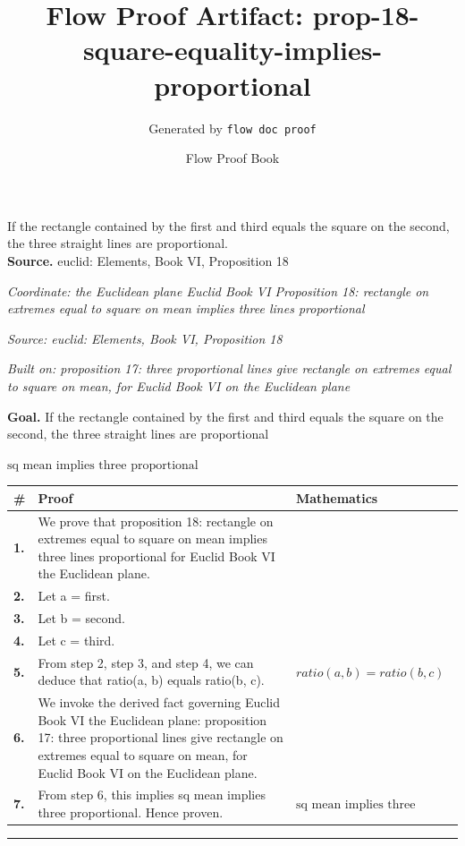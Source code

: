 \documentclass[11pt]{article}
\title{Flow Proof Artifact: prop-18-square-equality-implies-proportional}
\author{Generated by \texttt{flow doc proof}}
\date{Flow Proof Book}
\theoremstyle{definition}
\begin{document}
\maketitle
If the rectangle contained by the first and third equals the square on the second, the three straight lines are proportional.\\[0.5em]
\textbf{Source.} euclid: Elements, Book VI, Proposition 18\\[0.5em]
\bigskip
{}\par
\smallskip\noindent\textit{Coordinate: the Euclidean plane \cdot Euclid Book VI \cdot Proposition 18: rectangle on extremes equal to square on mean implies three lines proportional}\par
\smallskip\noindent\textit{Source: euclid: Elements, Book VI, Proposition 18}\par
\smallskip\noindent\textit{Built on: proposition 17: three proportional lines give rectangle on extremes equal to square on mean, for Euclid Book VI on the Euclidean plane}\par
\medskip
\noindent\textbf{Goal.} If the rectangle contained by the first and third equals the square on the second, the three straight lines are proportional\par
\noindent$\displaystyle \text{sq mean implies three proportional}$\par
\medskip
\noindent
\begin{tabular}{@{} >{\raggedright\arraybackslash}p{} >{\raggedright\arraybackslash}p{} >{\raggedleft\arraybackslash}p{} @{}}
\textbf{\#} & \textbf{Proof} & \textbf{Mathematics} \\
\midrule
\textbf{1.} & We prove that proposition 18: rectangle on extremes equal to square on mean implies three lines proportional for Euclid Book VI the Euclidean plane. & \\[0.45em]
\textbf{2.} & Let a = first. & \\[0.45em]
\textbf{3.} & Let b = second. & \\[0.45em]
\textbf{4.} & Let c = third. & \\[0.45em]
\textbf{5.} & From step 2, step 3, and step 4, we can deduce that ratio(a, b) equals ratio(b, c). & $\displaystyle ratio(a, b) = ratio(b, c)$ \\[0.45em]
\textbf{6.} & We invoke the derived fact governing Euclid Book VI the Euclidean plane: proposition 17: three proportional lines give rectangle on extremes equal to square on mean, for Euclid Book VI on the Euclidean plane. & \\[0.45em]
\textbf{7.} & From step 6, this implies sq mean implies three proportional. Hence proven. & $\displaystyle \text{sq mean implies three proportional}$ \\[0.45em]
\bottomrule
\end{tabular}
\label{thm:Geometry-Euclid Book VI-proposition_18_rectangle_on_extremes_equal_to_square_on_mean_implies_three_lines_proportional}
\par\medskip\hrule
\end{document}
